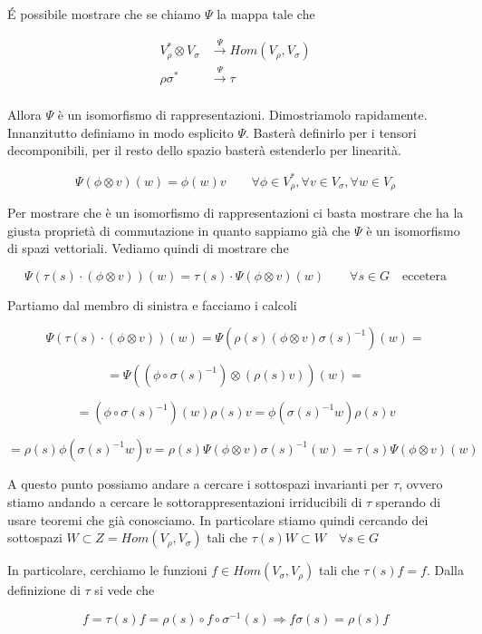 \documentclass[11pt]{article}
\theoremstyle{plain}
\theoremstyle{definition}
\theoremstyle{remark}
\begin{document}
\'E possibile mostrare che se chiamo $\Psi$ la mappa tale che


\begin{align*}
V_\rho^* \otimes V_\sigma &\xrightarrow{\Psi} Hom(V_\rho, V_\sigma)\\
\rho\sigma^* &\xrightarrow{\Psi} \tau \\
\end{align*}


Allora $\Psi$ è un isomorfismo di rappresentazioni. Dimostriamolo rapidamente. Innanzitutto definiamo in modo esplicito $\Psi$. Basterà definirlo per i tensori decomponibili, per il resto dello spazio basterà estenderlo per linearità.

\[ \Psi(\phi \otimes v ) (w) = \phi(w) v \qquad \forall \phi \in V_\rho^*, \forall v \in V_\sigma, \forall w \in V_\rho\]

Per mostrare che è un isomorfismo di rappresentazioni ci basta mostrare che ha la giusta proprietà di commutazione in quanto sappiamo già che $\Psi$ è un isomorfismo di spazi vettoriali. Vediamo quindi di mostrare che 

\[\Psi(\tau(s)\cdot (\phi \otimes v))(w) = \tau(s) \cdot \Psi(\phi \otimes v)(w) \qquad \forall s \in G \quad \text{eccetera} \]


Partiamo dal membro di sinistra e facciamo i calcoli


\[\Psi(\tau(s)\cdot (\phi \otimes v))(w) = \Psi\left( \rho(s) (\phi \otimes v ) \sigma(s)^{-1}  \right)(w)  = \]

\[= \Psi((\phi \circ \sigma(s)^{-1})\otimes (\rho(s) v) )(w) =  \]

\[ = (\phi \circ \sigma(s)^{-1}) (w) \rho(s) v = \phi(\sigma(s)^{-1} w) \rho(s) v\]

\[ = \rho(s)\phi(\sigma(s)^{-1} w) v = \rho(s) \Psi(\phi \otimes v) \sigma(s)^{-1} (w) = \tau(s) \Psi (\phi \otimes v)(w)\]


A questo punto possiamo andare a cercare i sottospazi invarianti per $\tau$, ovvero stiamo andando a cercare le sottorappresentazioni irriducibili di $\tau$ sperando di usare teoremi che già conosciamo. In particolare stiamo quindi cercando dei sottospazi $W \subset Z = Hom(V_\rho, V_\sigma)$ tali che $\tau(s) W \subset W \quad \forall s \in G$ 

In particolare, cerchiamo le funzioni $f \in Hom(V_\sigma, V_\rho)$ tali che $\tau(s) f = f$. Dalla definizione di $\tau$ si vede che

\[f = \tau(s) f =  \rho(s) \circ f \circ \sigma^{-1}(s) \Rightarrow  f \sigma(s)= \rho(s) f\] 
\end{document}
